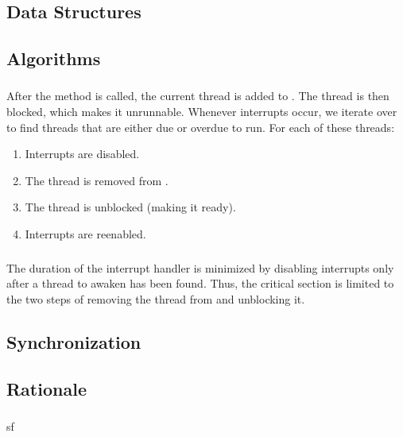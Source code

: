 \subsection{Data Structures}
	\subsubsection{}
	
\subsection{Algorithms}
	\subsubsection{}
		After the  method is called, the current thread is added to . The thread is then blocked, which makes it unrunnable. Whenever interrupts occur, we iterate over  to find threads that are either due or overdue to run. For each of these threads:
		\begin{enumerate}
			\item Interrupts are disabled.
			\item The thread is removed from .
			\item The thread is unblocked (making it ready).
			\item Interrupts are reenabled.
		\end{enumerate}
	\subsubsection{}
		The duration of the interrupt handler is minimized by disabling interrupts only after a thread to awaken has been found. Thus, the critical section is limited to the two steps of removing the thread from  and unblocking it.
\subsection{Synchronization}
	\subsubsection{}
	\subsubsection{}
\subsection{Rationale}
	\subsubsection{}
		sf